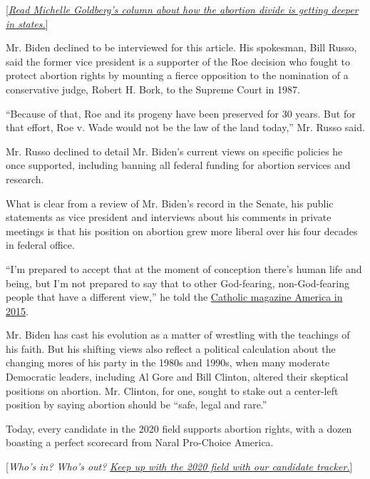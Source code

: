 {[}\href{https://www.nytimes3xbfgragh.onion/2019/03/29/opinion/abortion-heartbeat-ban-georgia.html}{\emph{Read
Michelle Goldberg's column about how the abortion divide is getting
deeper in states.}}{]}

Mr. Biden declined to be interviewed for this article. His spokesman,
Bill Russo, said the former vice president is a supporter of the Roe
decision who fought to protect abortion rights by mounting a fierce
opposition to the nomination of a conservative judge, Robert H. Bork, to
the Supreme Court in 1987.

``Because of that, Roe and its progeny have been preserved for 30 years.
But for that effort, Roe v. Wade would not be the law of the land
today,'' Mr. Russo said.

Mr. Russo declined to detail Mr. Biden's current views on specific
policies he once supported, including banning all federal funding for
abortion services and research.

What is clear from a review of Mr. Biden's record in the Senate, his
public statements as vice president and interviews about his comments in
private meetings is that his position on abortion grew more liberal over
his four decades in federal office.

``I'm prepared to accept that at the moment of conception there's human
life and being, but I'm not prepared to say that to other God-fearing,
non-God-fearing people that have a different view,'' he told the
\href{https://www.americamagazine.org/issue/everyones-entitled-dignity}{Catholic
magazine America in 2015}.

Mr. Biden has cast his evolution as a matter of wrestling with the
teachings of his faith. But his shifting views also reflect a political
calculation about the changing mores of his party in the 1980s and
1990s, when many moderate Democratic leaders, including Al Gore and Bill
Clinton, altered their skeptical positions on abortion. Mr. Clinton, for
one, sought to stake out a center-left position by saying abortion
should be ``safe, legal and rare.''

Today, every candidate in the 2020 field supports abortion rights, with
a dozen boasting a perfect scorecard from Naral Pro-Choice America.

{[}\emph{Who's in? Who's out?}
\href{https://www.nytimes3xbfgragh.onion/interactive/2019/us/politics/2020-presidential-candidates.html?action=click\&module=Intentional\&pgtype=Article}{\emph{Keep
up with the 2020 field with our candidate tracker.}}{]}

